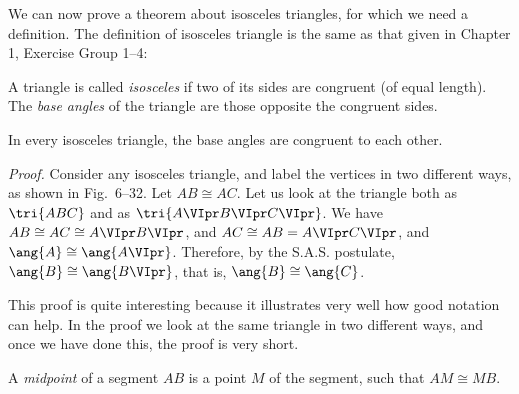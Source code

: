 \documentclass[11pt]{book}
\theoremstyle{bkplain}
\theoremstyle{XIplainnote}
\theoremstyle{bkplain}
\theoremstyle{bkplain}
\begin{document}
We can now prove a theorem about isosceles triangles, for which we need a
definition. The definition of isosceles triangle is the same as that given in
Chapter 1, Exercise Group 1--4:

\begin{definition}
A triangle is called \emph{isosceles} if two of its sides are congruent (of
equal length). The \emph{base angles} of the triangle are those opposite the
congruent sides.
\end{definition}

\begin{theorem}
In every isosceles triangle, the base angles are congruent to each other.
\end{theorem}

\emph{Proof.} Consider any isosceles triangle, and label the vertices in two
different ways, as shown in Fig.~6--32. Let $AB \cong AC$. Let us look at
the triangle both as $\tri{ABC}$ and as $\tri{A\VIpr B\VIpr C\VIpr}$. We have
$AB \cong AC \cong A\VIpr B\VIpr$, and $AC \cong AB = A\VIpr C\VIpr$, and
$\ang{A} \cong \ang{A\VIpr}$. Therefore, by the S.A.S. postulate, $\ang{B}
\cong \ang{B\VIpr}$, that is, $\ang{B} \cong \ang{C}$.

This proof is quite interesting because it illustrates very well how good
notation can help. In the proof we look at the same triangle in two different
ways, and once we have done this, the proof is very short.

\FIGVITHIRTYTWO

\begin{definition}
A \emph{midpoint} of a segment $AB$ is a point $M$ of the segment, such that
$AM \cong MB$.
\end{definition}
\end{document}
